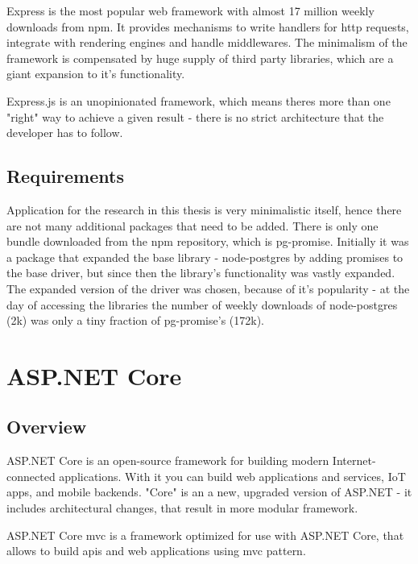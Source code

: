 Express is the most popular web framework with almost 17 million weekly downloads from \acrshort{npm}. It provides mechanisms to write handlers for \acrshort{http} requests, integrate with rendering engines and handle middlewares. The minimalism of the framework is compensated by huge supply of third party libraries, which are a giant expansion to it's functionality.

Express.js is an unopinionated framework, which means theres more than one "right" way to achieve a given result - there is no strict architecture that the developer has to follow.

\subsection{Requirements}
Application for the research in this thesis is very minimalistic itself, hence there are not many additional packages that need to be added. There is only one bundle downloaded from the \acrshort{npm} repository, which is pg-promise. Initially it was a package that expanded the base library - node-postgres by adding promises to the base driver, but since then the library's functionality was vastly expanded. %
The expanded version of the driver was chosen, because of it's popularity - at the day of accessing the libraries the number of weekly downloads of node-postgres (2k) was only a tiny fraction of pg-promise's (172k). %


\section{ASP.NET Core}

\subsection{Overview}
ASP.NET Core is an open-source framework for building modern Internet-connected applications. With it you can build web applications and services, IoT apps, and mobile backends. "Core" is an a new, upgraded version of ASP.NET - it includes architectural changes, that result in more modular framework. %

ASP.NET Core \acrshort{mvc} is a framework optimized for use with ASP.NET Core, that allows to build \acrshort{api}s and web applications using \acrlong{mvc} pattern. %

